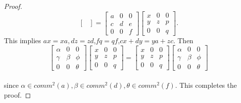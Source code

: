 \documentclass[12pt, reqno]{amsart}
\numberwithin{equation}{section}
\begin{document}
\begin{proof}
$$\begin{bmatrix}
\end{bmatrix}=\begin{bmatrix}a&0&0\\c&d&e\\0&0&f
\end{bmatrix}\begin{bmatrix}x&0&0\\y&z&p\\0&0&q
\end{bmatrix}.$$ This implies $ax=xa,dz=zd$,$fq=qf$,$cx+dy=ya+zc$. Then $$\begin{bmatrix}\alpha&0&0\\\gamma&\beta&\phi\\0&0&\theta
\end{bmatrix}\begin{bmatrix}x&0&0\\y&z&p\\0&0&q
\end{bmatrix}=\begin{bmatrix}x&0&0\\y&z&p\\0&0&q
\end{bmatrix}\begin{bmatrix}\alpha&0&0\\\gamma&\beta&\phi\\0&0&\theta
\end{bmatrix}$$\\ since $\alpha\in comm^2(a),\beta\in comm^2(d),\theta \in comm^2(f)$. This completes the proof.
\end{proof}
\end{document}

